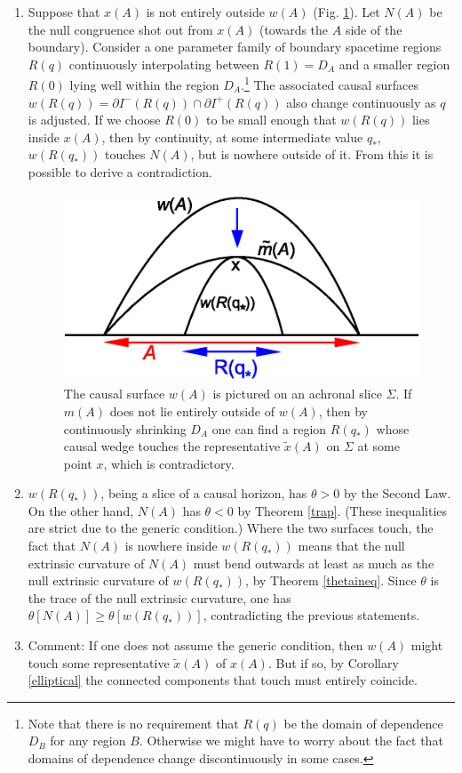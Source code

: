 \documentclass{article}
\begin{document}
\begin{enumerate}[resume]
\begin{enumerate}
	\item Suppose that $x(A)$ is not entirely outside $w(A)$ (Fig. \ref{wvsm}).  Let $N(A)$ be the null congruence shot out from $x(A)$ (towards the $A$ side of the boundary).  Consider a one parameter family of boundary spacetime regions $R(q)$ continuously interpolating between $R(1) = D_A$ and a smaller region $R(0)$ lying well within the region $D_A$.\footnote{Note that there is no requirement that $R(q)$ be the domain of dependence $D_B$ for any region $B$.  Otherwise we might have to worry about the fact that domains of dependence change discontinuously in some cases.}  The associated causal surfaces $w(R(q)) = \partial I^-(R(q)) \cap \partial I^+(R(q))$ also change continuously as $q$ is adjusted.  If we choose $R(0)$ to be small enough that $w(R(q))$ lies inside $x(A)$, then by continuity, at some intermediate value $q_*$, $w(R(q_*))$ touches $N(A)$, but is nowhere outside of it.  From this it is possible to derive a contradiction.
\begin{figure}[ht]
\centering
\includegraphics[width=.47\textwidth]{wvsm.eps}
\caption{\footnotesize The causal surface $w(A)$ is pictured on an achronal slice $\Sigma$.  If $m(A)$ does not lie entirely outside of $w(A)$, then by continuously shrinking $D_A$ one can find a region $R(q_*)$ whose causal wedge touches the representative $\tilde{x}(A)$ on $\Sigma$ at some point $x$, which is contradictory.}\label{wvsm}
\end{figure}\label{wvsm}
	\item $w(R(q_*))$, being a slice of a causal horizon, has $\theta > 0$ by the Second Law.  On the other hand, $N(A)$ has $\theta < 0$ by Theorem \ref{trap}.  (These inequalities are strict due to the generic condition.) Where the two surfaces touch, the fact that $N(A)$ is nowhere inside $w(R(q_*))$ means that the null extrinsic curvature of $N(A)$ must bend outwards at least as much as the null extrinsic curvature of $w(R(q_*))$, by Theorem \ref{thetaineq}.  Since $\theta$ is the trace of the null extrinsic curvature, one has $\theta[N(A)] \ge \theta[w(R(q_*))]$, contradicting the previous statements.
	\item Comment: If one does not assume the generic condition, then $w(A)$ might touch some representative $\tilde{x}(A)$ of $x(A)$.  But if so, by Corollary \ref{elliptical} the connected components that touch must entirely coincide.

\end{enumerate}
\end{enumerate}
\end{document}
